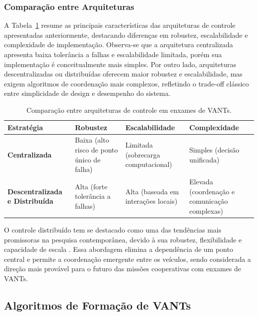 \subsubsection{Comparação entre Arquiteturas}

A Tabela~\ref{tab:arquiteturas-uavs} resume as principais características das arquiteturas de controle apresentadas anteriormente, destacando diferenças em robustez, escalabilidade e complexidade de implementação. Observa-se que a arquitetura centralizada apresenta baixa tolerância a falhas e escalabilidade limitada, porém sua implementação é conceitualmente mais simples. Por outro lado, arquiteturas descentralizadas ou distribuídas oferecem maior robustez e escalabilidade, mas exigem algoritmos de coordenação mais complexos, refletindo o trade-off clássico entre simplicidade de design e desempenho do sistema.


\begin{table}[h!]
\centering
\caption{Comparação entre arquiteturas de controle em enxames de VANTs.}
\label{tab:arquiteturas-uavs}
\begin{tabular}{|p{3cm}|p{4cm}|p{3cm}|p{4cm}|}
\hline
\textbf{Estratégia} & \textbf{Robustez} & \textbf{Escalabilidade} & \textbf{Complexidade} \\ \hline
\textbf{Centralizada} & Baixa (alto risco de ponto único de falha) \citep{ouyang2023formation} & Limitada (sobrecarga computacional) \citep{bu2024advancement} & Simples (decisão unificada) \citep{bu2024advancement} \\ \hline
\textbf{Descentralizada e Distribuída} & Alta (forte tolerância a falhas) \citep{ouyang2023formation} & Alta (baseada em interações locais) \citep{bu2024advancement} & Elevada (coordenação e comunicação complexas) \citep{bu2024advancement} \\ \hline
\end{tabular}
\end{table}


O controle distribuído tem se destacado como uma das tendências mais promissoras na pesquisa contemporânea, devido à sua robustez, flexibilidade e capacidade de escala \citep{ouyang2023formation}. Essa abordagem elimina a dependência de um ponto central e permite a coordenação emergente entre os veículos, sendo considerada a direção mais provável para o futuro das missões cooperativas com enxames de VANTs.

\subsection{Algoritmos de Formação de VANTs}

